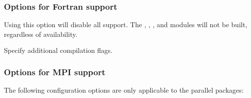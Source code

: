 
\subsubsection*{Options for Fortran support}

\begin{config}

\item {}

  Using this option will disable all {\F} support. The {\fcvode},
  {\fkinsol}, {\fida}, and {\fnvector} modules will not be built,
  regardless of availability.

\item {}

  Specify additional {\F} compilation flags.

\end{config}



\subsubsection*{Options for MPI support}

\noindent The following configuration options are only applicable to the parallel
{\sundials} packages:

